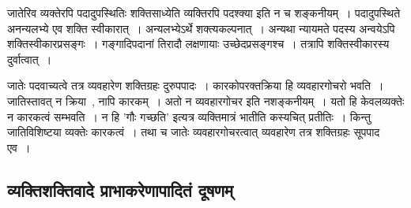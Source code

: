 	जातेरिव व्यक्तेरपि पदादुपस्थितिः शक्तिसाध्येति व्यक्तिरपि पदश्क्या इति न च शङ्कनीयम्~। पदादुपस्थिते अनन्यलभ्ये एव शक्ति स्वीकारात्~। अन्यलभ्येऽर्थे शक्त्यकल्पनात्~। अन्यथा न्यायमते पदस्य अन्वयेऽपि शक्तिस्वीकारप्रसङ्गः~। गङ्गादिपदानां तिरादौ लक्षणायाः उच्छेदप्रसङ्गश्च~। तत्रापि शक्तिस्वीकारस्य दुर्वात्वात्~।

	जातेः पदवाच्यत्वे तत्र व्यवहारेण  शक्तिग्रहः दुरुपपादः~। कारकोपरक्तक्रिया हि व्यवहारगोचरो भवति~। जातिस्तावत् न क्रिया~, नापि कारकम्~। अतो न व्यवहारगोचर इति नशङ्कनीयम्~। यतो हि केवलव्यक्तेः न कारकत्वं सम्भवति~। न हि 'गौः गच्छति' इत्यत्र व्यक्तिमात्रं भातीति कस्यचित् प्रतीतिः~। किन्तु जातिविशिष्टया व्यक्तेः कारकत्वं~। तथा च जातेः व्यवहारगोचरत्वात् व्यवहारेण तत्र शक्तिग्रहः सूपपाद एव~।

		\subsection{व्यक्तिशक्तिवादे प्राभाकरेणापादितं दूषणम् }
			
